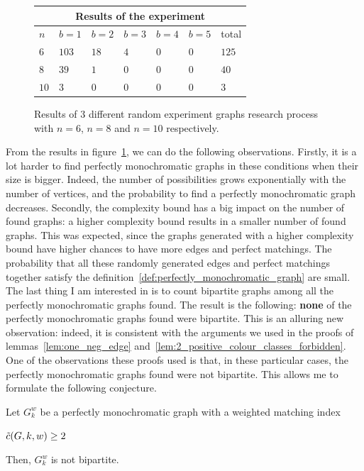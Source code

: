 \begin{figure}[H]
    \centering
    \begin{tabular}{ |p{1cm}||p{2cm}|p{2cm}|p{2cm}|p{2cm}|p{2cm}|p{2cm}|  }
        \hline
        \multicolumn{7}{|c|}{Results of the experiment} \\
        \hline
        $n$ & $b = 1$ & $b = 2$ & $b = 3$ & $b = 4$ & $b = 5$ & total \\
        \hline
        $6 $ & $103$ & $18$ & $4$ & $0$ & $0$ & $125$ \\
        $8 $ & $39$  & $1$  & $0$ & $0$ & $0$ & $40$  \\
        $10$ & $3$   & $0$  & $0$ & $0$ & $0$ & $3$   \\
        \hline
    \end{tabular}
    \caption{Results of $3$ different random experiment graphs research process with $n=6$, $n=8$ and $n=10$ respectively.}
    \label{fig:results-experiment}
\end{figure}

From the results in figure~\ref{fig:results-experiment}, we can do the following observations.
Firstly, it is a lot harder to find perfectly monochromatic graphs in these conditions when their size is bigger.
Indeed, the number of possibilities grows exponentially with the number of vertices, and the probability to find a perfectly monochromatic graph decreases.
Secondly, the complexity bound has a big impact on the number of found graphs: a higher complexity bound results in a smaller number of found graphs.
This was expected, since the graphs generated with a higher complexity bound have higher chances to have more edges and perfect matchings.
The probability that all these randomly generated edges and perfect matchings together satisfy the definition~\ref{def:perfectly_monochromatic_graph} are small.\\

The last thing I am interested in is to count bipartite graphs among all the perfectly monochromatic graphs found.
The result is the following: \textbf{none} of the perfectly monochromatic graphs found were bipartite.
This is an alluring new observation: indeed, it is consistent with the arguments we used in the proofs of lemmas~\ref{lem:one_neg_edge} and~\ref{lem:2_positive_colour_classes_forbidden}.
One of the observations these proofs used is that, in these particular cases, the perfectly monochromatic graphs found were not bipartite.
This allows me to formulate the following conjecture.

\begin{conjecture}
    \label{con:bipartite_perfectly_monochromatic}
    Let $G_k^w$ be a perfectly monochromatic graph with a weighted matching index
    \begin{center}
        $\Tilde{c}(G, k, w) \geq 2$
    \end{center}
    Then, $G_k^w$ is not bipartite.
\end{conjecture}
